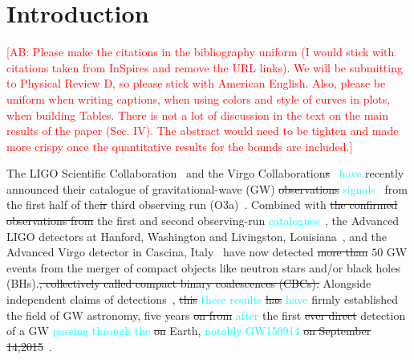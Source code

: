 \documentclass[twocolumn,prd,aps,superscriptaddress,preprintnumbers,tightenlines,showpacs,nofootinbib,eqsecnum,amsfonts,amsmath]{revtex4-1}
\newcommand{\ab}[1]{\textcolor{cyan}{#1}}
\newcommand{\comment}[1]{\textcolor{red}{[#1]}}
\begin{document}
\maketitle


\section{Introduction}\label{sec:intro}

\comment{AB: Please make the citations in the bibliography uniform (I would stick with citations 
taken from InSpires and remove the URL links). We will be submitting to Physical Review D, so please 
stick with American English. Also, please be uniform when writing captions, when using colors and style 
of curves in plots, when building Tables. There is not a lot of discussion in the text on the main results of the paper (Sec. IV). 
The abstract would need to be tighten and made more crispy once the quantitative results for the 
bounds are included.}

The LIGO Scientific Collaboration~\citep{lsc} and the Virgo
Collaboration\sout{s}~\citep{Virgo} \ab{have} recently announced their catalogue of
gravitational-wave (GW) \sout{observations} \ab{signals}~\citep{GWTC-2} from the first
half of the\sout{ir} third observing run (O3a)~\citep{O3reference}. Combined
with \sout{the confirmed observations from} the first and second observing-run \ab{catalogues}~\citep{abbott2019gwtc}, the Advanced LIGO detectors at Hanford,
Washington and Livingston, Louisiana~\citep{aasi2015characterization},
and the Advanced Virgo detector in Cascina,
Italy~\citep{acernese2014advanced} have now detected \sout{more than} $50$ GW
events from the merger of compact objects like neutron stars and/or
black holes (BHs).\sout{, collectively called compact binary coalescences
(CBCs).} Alongside independent claims of
detections~\citep{nitz20191,nitz20202,2019PhRvD.100b3007Z,2020PhRvD.101h3030V,Venumadhav_2020},
\sout{this} \ab{these results} \sout{has} \ab{have} firmly established the field of GW astronomy, five years \sout{on
from} \ab{after} the first \sout{ever direct} detection of a GW \ab{passing through the} \sout{on} Earth, \ab{notably GW150914} 
\sout{on September 14,2015}~\citep{abbott2016observation}.
\end{document}
